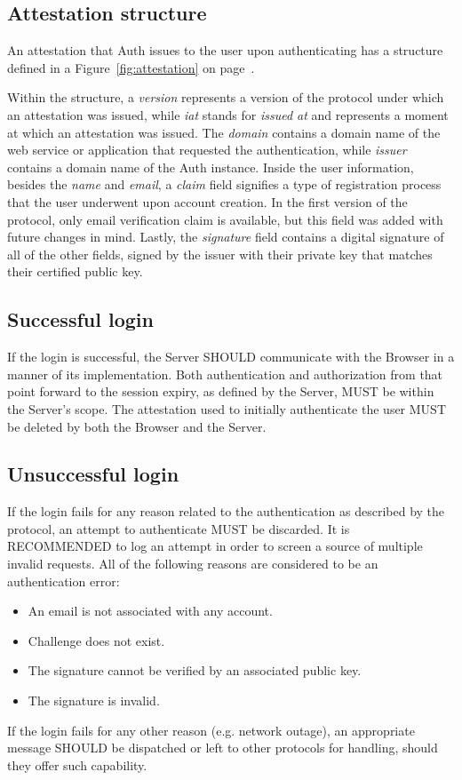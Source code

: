     \subsection{Attestation structure}
    An attestation that Auth issues to the user upon authenticating has a structure defined in a Figure~\ref{fig:attestation}
    on page~\pageref{fig:attestation}.
    
    Within the structure, a \textit{version} represents a version of the protocol under which an attestation was issued, 
    while \textit{iat} stands for \textit{issued at} and represents a moment at which an attestation was issued. The 
    \textit{domain} contains a domain name of the web service or application that requested the authentication, while 
    \textit{issuer} contains a domain name of the Auth instance. Inside the user information, besides the \textit{name}
    and \textit{email}, a \textit{claim} field signifies a type of registration process that the user underwent upon 
    account creation. In the first version of the protocol, only email verification claim is available, but this field 
    was added with future changes in mind. Lastly, the \textit{signature} field contains a digital signature of all of 
    the other fields, signed by the issuer with their private key that matches their certified public key. 

    \subsection{Successful login}
    If the login is successful, the Server SHOULD communicate with the Browser in a manner of its implementation. Both 
    authentication and authorization from that point forward to the session expiry, as defined by the Server, MUST be 
    within the Server's scope. The attestation used to initially authenticate the user MUST be deleted by both the Browser
    and the Server.

    \subsection{Unsuccessful login}
    If the login fails for any reason related to the authentication as described by the protocol, an attempt to 
    authenticate MUST be discarded. It is RECOMMENDED to log an attempt in order to screen a source of multiple invalid 
    requests. All of the following reasons are considered to be an authentication error:
        \begin{itemize}
            \item An email is not associated with any account.
            \item Challenge does not exist.
            \item The signature cannot be verified by an associated public key.
            \item The signature is invalid.
        \end{itemize}
    If the login fails for any other reason (e.g. network outage), an appropriate message SHOULD be dispatched or left 
    to other protocols for handling, should they offer such capability.

        

